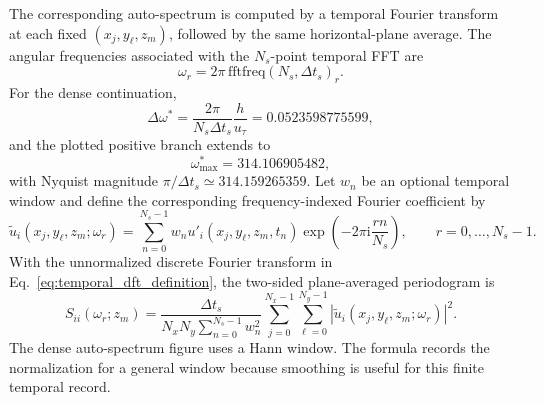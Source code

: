 \documentclass[11pt]{article}
\newcommand{\ii}{\mathrm{i}}
\begin{document}
The corresponding auto-spectrum is computed by a temporal Fourier transform
at each fixed \((x_j,y_\ell,z_m)\), followed by the same horizontal-plane
average. The angular frequencies associated with the \(N_s\)-point temporal
FFT are
\begin{equation}
  \omega_r
  =
  2\pi\,\mathrm{fftfreq}(N_s,\Delta t_s)_r .
  \label{eq:temporal_omega_grid}
\end{equation}
For the dense continuation,
\[
  \Delta\omega^*=\frac{2\pi}{N_s\Delta t_s}\frac{h}{u_\tau}
  = 0.0523598775599,
\]
and the plotted positive branch extends to
\[
  \omega^*_{\max}=314.106905482,
\]
with Nyquist magnitude \(\pi/\Delta t_s\simeq314.159265359\).
Let \(w_n\) be an optional temporal window and define the corresponding
frequency-indexed Fourier coefficient by
\begin{equation}
  \widetilde{u}_{i}(x_j,y_\ell,z_m;\omega_r)
  =
  \sum_{n=0}^{N_s-1}
  w_n u'_i(x_j,y_\ell,z_m,t_n)
  \exp\left(-2\pi\ii\frac{rn}{N_s}\right),
  \qquad r=0,\ldots,N_s-1.
  \label{eq:temporal_dft_definition}
\end{equation}
With the unnormalized discrete Fourier transform in
Eq.~\eqref{eq:temporal_dft_definition}, the two-sided plane-averaged
periodogram is
\begin{equation}
  S_{ii}(\omega_r;z_m)
  =
  \frac{\Delta t_s}{N_xN_y\sum_{n=0}^{N_s-1}w_n^2}
  \sum_{j=0}^{N_x-1}
  \sum_{\ell=0}^{N_y-1}
  \left|
  \widetilde{u}_{i}(x_j,y_\ell,z_m;\omega_r)
  \right|^2 .
  \label{eq:plane_autospectrum_estimator}
\end{equation}
The dense auto-spectrum figure uses a Hann window. The formula records the
normalization for a general window because smoothing is useful for this finite
temporal record.
\end{document}
